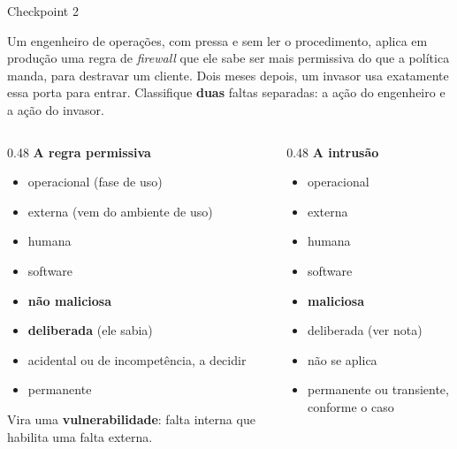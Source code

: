 \documentclass{beamer}
\begin{document}
\begin{frame}{Checkpoint 2}
    \footnotesize
    \begin{checkpoint}
        \scriptsize
        Um engenheiro de opera\c{c}\~oes, com pressa e sem ler o procedimento, aplica em produ\c{c}\~ao uma regra de \textit{firewall} que ele sabe ser mais permissiva do que a pol\'itica manda, para destravar um cliente. Dois meses depois, um invasor usa exatamente essa porta para entrar.
        \medskip
        Classifique \textbf{duas} faltas separadas: a a\c{c}\~ao do engenheiro e a a\c{c}\~ao do invasor.
    \end{checkpoint}
    \smallskip
    \pause
    \scriptsize
    \begin{columns}[T]
        \begin{column}{0.48\textwidth}
            \textbf{A regra permissiva}
            \begin{itemize}
                \item operacional (fase de uso)
                \item externa (vem do ambiente de uso)
                \item humana
                \item software
                \item \textbf{n\~ao maliciosa}
                \item \textbf{deliberada} (ele sabia)
                \item acidental ou de incompet\^encia, a decidir
                \item permanente
            \end{itemize}
            Vira uma \textbf{vulnerabilidade}: falta interna que habilita uma falta externa.
        \end{column}
        \begin{column}{0.48\textwidth}
            \textbf{A intrus\~ao}
            \begin{itemize}
                \item operacional
                \item externa
                \item humana
                \item software
                \item \textbf{maliciosa}
                \item deliberada (ver nota)
                \item n\~ao se aplica
                \item permanente ou transiente, conforme o caso

\end{itemize}
\end{column}
\end{columns}
\end{frame}
\end{document}
